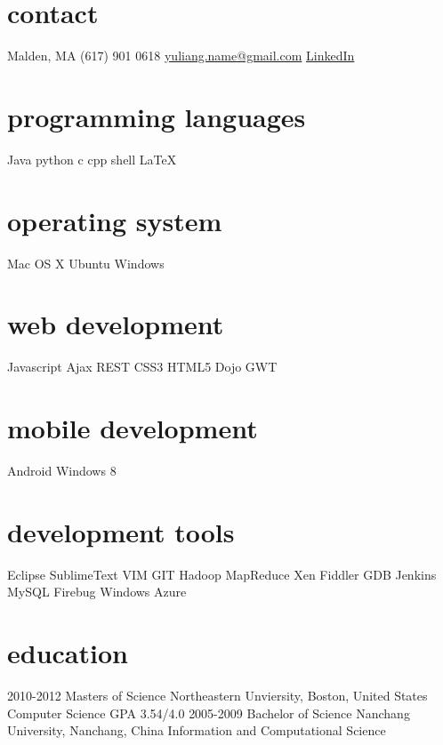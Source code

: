 \documentclass[]{ly-cv} %
\begin{document}
\begin{aside} %
\section{contact}
Malden, MA
(617) 901 0618
\href{mailto:yuliang.name@gmail.com}{yuliang.name@gmail.com}
\href{http://www.linkedin.com/in/liangyu2012neu}{LinkedIn}
\section{programming languages}
Java python c cpp 
shell \LaTeX
\section{operating system}
Mac OS X Ubuntu Windows
\section{web development}
Javascript Ajax REST
CSS3 HTML5 Dojo GWT
\section{mobile development}
Android Windows 8
\section{development tools}
Eclipse SublimeText VIM
GIT Hadoop MapReduce
Xen Fiddler GDB Jenkins 
MySQL Firebug Windows Azure
\end{aside}


\section{education}

\begin{entrylist}
\entry
{2010-2012}
{Masters of Science} 
{Northeastern Unviersity, Boston, United States}
{Computer Science \hspace{4mm} \footnotesize{GPA 3.54/4.0}}
\entry
{2005-2009}
{Bachelor of Science}
{Nanchang University, Nanchang, China}
{Information and Computational Science}
\end{entrylist}
\end{document}
